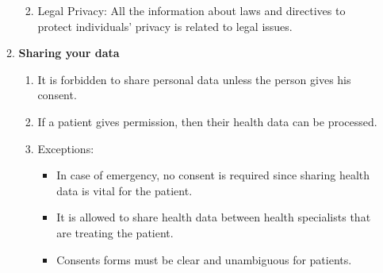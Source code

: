 \documentclass[10pt, twoside]{article}   	%
\begin{document}
\begin{enumerate}
\begin{enumerate}
\begin{enumerate}
\begin{itemize}
                      \end{itemize}                      
                \item Legal Privacy: All the information about laws and directives to protect individuals' privacy is related to legal issues.
             \end{enumerate}      
        \item \textbf{Sharing your data} 
            \begin{enumerate}    
                \item It is forbidden to share personal data unless the person gives his consent.
                \item If a patient gives permission, then their health data can be processed.
                \item Exceptions:
                    \begin{itemize}
                        \item In case of emergency, no consent is required since sharing health data is vital for the patient.
                        \item It is allowed to share health data between health specialists that are treating the patient.
                        \item Consents forms must be clear and unambiguous for patients.
                    \end{itemize}                            
            \end{enumerate}                
   \end{enumerate}
 \end {enumerate}
\end{document}
